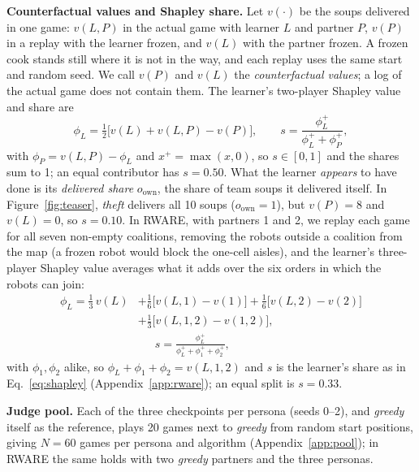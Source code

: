 \documentclass[letterpaper]{article} %
\begin{document}
\textbf{Counterfactual values and Shapley share.} Let $v(\cdot)$ be the soups delivered in one game: $v(L,P)$ in the
actual game with learner $L$ and partner $P$, $v(P)$ in a replay with the learner frozen, and $v(L)$ with the
partner frozen. A frozen cook stands still where it is not in the way, and each replay uses the same start and
random seed. We call $v(P)$ and $v(L)$ the \emph{counterfactual values}; a log of the actual game does not contain
them. The learner's two-player Shapley value \cite{shapley1953value} and share are
\begin{equation}
\phi_L = \tfrac{1}{2}\bigl[v(L) + v(L,P) - v(P)\bigr],\qquad s = \frac{\phi_L^+}{\phi_L^+ + \phi_P^+},
\label{eq:shapley}
\end{equation}
with $\phi_P=v(L,P)-\phi_L$ and $x^+=\max(x,0)$, so $s\in[0,1]$ and the shares sum to 1; an equal contributor has
$s=0.50$. What the learner \emph{appears} to have done is its \emph{delivered share} $o_{\mathrm{own}}$, the share of
team soups it delivered itself. In Figure~\ref{fig:teaser}, \emph{theft} delivers all 10 soups
($o_{\mathrm{own}}=1$), but $v(P)=8$ and $v(L)=0$, so $s=0.10$.
In RWARE, with partners 1 and 2, we replay each game for all seven non-empty coalitions, removing the robots outside
a coalition from the map (a frozen robot would block the one-cell aisles), and the learner's three-player Shapley
value averages what it adds over the six orders in which the robots can join:
\begin{equation}
\begin{aligned}
\phi_L = \tfrac13\,v(L) &+ \tfrac16\bigl[v(L,1)-v(1)\bigr] + \tfrac16\bigl[v(L,2)-v(2)\bigr]\\
&+ \tfrac13\bigl[v(L,1,2)-v(1,2)\bigr],\\
&\phantom{+}\; s =\frac{\phi_L^+}{\phi_L^+ + \phi_1^+ + \phi_2^+},
\end{aligned}
\label{eq:shapley3}
\end{equation}
with $\phi_1,\phi_2$ alike, so $\phi_L+\phi_1+\phi_2=v(L,1,2)$ and $s$ is the learner's share as in
Eq.~\eqref{eq:shapley} (Appendix~\ref{app:rware}); an equal split is $s=0.33$.

\textbf{Judge pool.} Each of the three checkpoints per persona (seeds 0--2), and \emph{greedy} itself as the
reference, plays 20 games next to \emph{greedy} from random start positions, giving $N=60$ games per persona and
algorithm (Appendix~\ref{app:pool}); in RWARE the same holds with two \emph{greedy} partners and the three personas.
\end{document}
